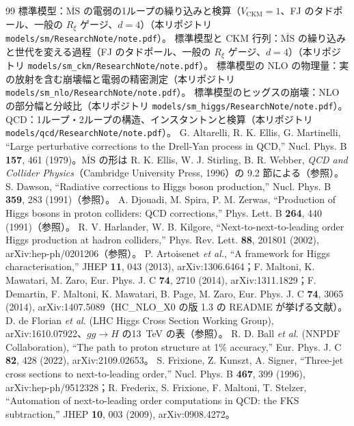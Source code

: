 \documentclass[a4paper,10pt]{ltjsarticle}
\newcommand{\MSbar}{\overline{\mathrm{MS}}}
\begin{document}
\begin{thebibliography}{99}
 標準模型：$\MSbar$ の電弱の1ループの繰り込みと検算（$V_{\mathrm{CKM}}=1$、FJ のタドポール、一般の $R_\xi$ ゲージ、$d=4$）（本リポジトリ \nolinkurl{models/sm/ResearchNote/note.pdf}）。
 標準模型と CKM 行列：$\MSbar$ の繰り込みと世代を変える過程（FJ のタドポール、一般の $R_\xi$ ゲージ、$d=4$）（本リポジトリ \nolinkurl{models/sm_ckm/ResearchNote/note.pdf}）。
 標準模型の NLO の物理量：実の放射を含む崩壊幅と電弱の精密測定（本リポジトリ \nolinkurl{models/sm_nlo/ResearchNote/note.pdf}）。
 標準模型のヒッグスの崩壊：NLO の部分幅と分岐比（本リポジトリ \nolinkurl{models/sm_higgs/ResearchNote/note.pdf}）。
 QCD：1ループ・2ループの構造、インスタントンと検算（本リポジトリ \nolinkurl{models/qcd/ResearchNote/note.pdf}）。
 G. Altarelli, R. K. Ellis, G. Martinelli, ``Large perturbative corrections to the Drell-Yan process in QCD,'' Nucl. Phys. B \textbf{157}, 461 (1979)。$\MSbar$ の形は R. K. Ellis, W. J. Stirling, B. R. Webber, \textit{QCD and Collider Physics}（Cambridge University Press, 1996）の 9.2 節による（参照）。
 S. Dawson, ``Radiative corrections to Higgs boson production,'' Nucl. Phys. B \textbf{359}, 283 (1991)（参照）。
 A. Djouadi, M. Spira, P. M. Zerwas, ``Production of Higgs bosons in proton colliders: QCD corrections,'' Phys. Lett. B \textbf{264}, 440 (1991)（参照）。
 R. V. Harlander, W. B. Kilgore, ``Next-to-next-to-leading order Higgs production at hadron colliders,'' Phys. Rev. Lett. \textbf{88}, 201801 (2002), arXiv:hep-ph/0201206（参照）。
 P. Artoisenet \textit{et al.}, ``A framework for Higgs characterisation,'' JHEP \textbf{11}, 043 (2013), arXiv:1306.6464；F. Maltoni, K. Mawatari, M. Zaro, Eur. Phys. J. C \textbf{74}, 2710 (2014), arXiv:1311.1829；F. Demartin, F. Maltoni, K. Mawatari, B. Page, M. Zaro, Eur. Phys. J. C \textbf{74}, 3065 (2014), arXiv:1407.5089（HC\_NLO\_X0 の版 1.3 の README が挙げる文献）。
 D. de Florian \textit{et al.} (LHC Higgs Cross Section Working Group), arXiv:1610.07922、$gg\to H$ の13~TeV の表（参照）。
 R. D. Ball \textit{et al.} (NNPDF Collaboration), ``The path to proton structure at 1\% accuracy,'' Eur. Phys. J. C \textbf{82}, 428 (2022), arXiv:2109.02653。
 S. Frixione, Z. Kunszt, A. Signer, ``Three-jet cross sections to next-to-leading order,'' Nucl. Phys. B \textbf{467}, 399 (1996), arXiv:hep-ph/9512328；R. Frederix, S. Frixione, F. Maltoni, T. Stelzer, ``Automation of next-to-leading order computations in QCD: the FKS subtraction,'' JHEP \textbf{10}, 003 (2009), arXiv:0908.4272。

\end{thebibliography}
\end{document}
